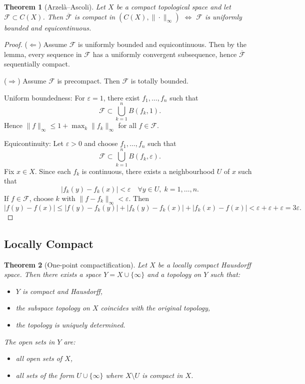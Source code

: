 \documentclass[12pt]{article}
\newtheorem{theorem}{Theorem}
\begin{document}
\begin{theorem}[Arzelà--Ascoli]
Let $X$ be a compact topological space and let $\mathcal{F} \subset C(X)$.
Then $\overline{\mathcal{F}}$ is compact in $(C(X),\|\cdot\|_\infty)$ $\Leftrightarrow$
$\mathcal{F}$ is uniformly bounded and equicontinuous.
\end{theorem}

\begin{proof}
($\Leftarrow$) Assume $\mathcal{F}$ is uniformly bounded and equicontinuous.
Then by the lemma, every sequence in $\mathcal{F}$ has a uniformly convergent subsequence, hence $\overline{\mathcal{F}}$ sequentially compact.

($\Rightarrow$) Assume $\mathcal{F}$ is precompact. Then $\mathcal{F}$ is totally bounded.

Uniform boundedness:  
For $\varepsilon=1$, there exist $f_1,\dots,f_n$ such that
\[
\mathcal{F} \subset \bigcup_{k=1}^n B(f_k,1).
\]
Hence $\|f\|_\infty \le 1 + \max_k \|f_k\|_\infty$ for all $f \in \mathcal{F}$.

Equicontinuity:  
Let $\varepsilon>0$ and choose $f_1,\dots,f_n$ such that
\[
\mathcal{F} \subset \bigcup_{k=1}^n B(f_k,\varepsilon).
\]
Fix $x\in X$. Since each $f_k$ is continuous, there exists a neighbourhood $U$ of $x$
such that
\[
|f_k(y)-f_k(x)|<\varepsilon \quad \forall y\in U,\; k=1,\dots,n.
\]
If $f\in\mathcal{F}$, choose $k$ with $\|f-f_k\|_\infty<\varepsilon$. Then
\[
|f(y)-f(x)|
\le |f(y)-f_k(y)| + |f_k(y)-f_k(x)| + |f_k(x)-f(x)|
< \varepsilon + \varepsilon + \varepsilon = 3\varepsilon.
\]
\end{proof}

\subsection*{Locally Compact}
\begin{theorem}[One-point compactification]
Let $X$ be a locally compact Hausdorff space. Then there exists a space
$Y = X \cup \{\infty\}$ and a topology on $Y$ such that:

\begin{itemize}
    \item $Y$ is compact and Hausdorff,
    \item the subspace topology on $X$ coincides with the original topology,
    \item the topology is uniquely determined.
\end{itemize}

The open sets in $Y$ are:
\begin{itemize}
    \item all open sets of $X$,
    \item all sets of the form $U \cup \{\infty\}$ where $X \setminus U$ is compact in $X$.
\end{itemize}
\end{theorem}
\end{document}
